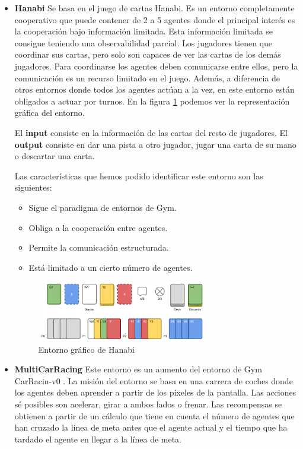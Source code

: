 \begin{itemize}
	\item \textbf{Hanabi} \cite{hanabi-repo} Se basa en el juego de cartas Hanabi. Es un entorno completamente cooperativo que puede contener de 2 a 5 agentes donde el principal interés es la cooperación bajo información limitada. Esta información limitada se consigue teniendo una observabilidad parcial. Los jugadores tienen que coordinar sus cartas, pero solo son capaces de ver las cartas de los demás jugadores. Para coordinarse los agentes deben comunicarse entre ellos, pero la comunicación es un recurso limitado en el juego. Además, a diferencia de otros entornos donde todos los agentes actúan a la vez, en este entorno están obligados a actuar por turnos. En la figura \ref {fig:hanabi} podemos ver la representación gráfica del entorno.

	      El \textbf{input} consiste en la información de las cartas del resto de jugadores. El \textbf{output} consiste en dar una pista a otro jugador, jugar una carta de su mano o descartar una carta.

	      Las características que hemos podido identificar este entorno son las siguientes:
	      \begin{itemize}
		      \item Sigue el paradigma de entornos de Gym.
		      \item Obliga a la cooperación entre agentes.
		      \item Permite la comunicación estructurada.
		      \item Está limitado a un cierto número de agentes.
	      \end{itemize}


	      \begin{figure}[ht]
		      \centering
		      \includegraphics[width=0.7\textwidth]{img/hanabi.png}
		      \caption{Entorno gráfico de Hanabi \cite{env-list}}
		      \label{fig:hanabi}
	      \end{figure}

	\item \textbf{MultiCarRacing} \cite{multicar-repo} Este entorno es un aumento del entorno de Gym CarRacin-v0 \cite {car-repo}. La misión del entorno se basa en una carrera de coches donde los agentes deben aprender a partir de los píxeles de la pantalla. Las acciones sé posibles son acelerar, girar a ambos lados o frenar. Las recompensas se obtienen a partir de un cálculo que tiene en cuenta el número de agentes que han cruzado la línea de meta antes que el agente actual y el tiempo que ha tardado el agente en llegar a la línea de meta.


\end{itemize}
